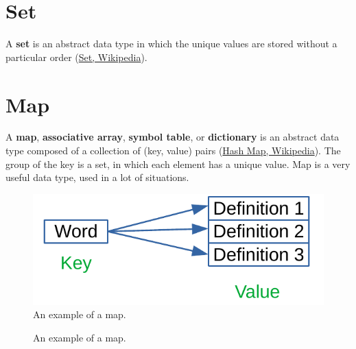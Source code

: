 \section{Set}
A \textbf{set} is an abstract data type in which the unique values are stored without a particular order \cite{wikiset} (\href{https://en.wikipedia.org/wiki/Set_(abstract_data_type)}{Set, Wikipedia}).

\section{Map}
A \textbf{map}, \textbf{associative array}, \textbf{symbol table}, or \textbf{dictionary} is an abstract data type composed of a collection of (key, value) pairs \cite{wikihashmap} (\href{https://en.wikipedia.org/wiki/Associative_array}{Hash Map, Wikipedia}). The group of the key is a set, in which each element has a unique value. Map is a very useful data type, used in a lot of situations. 

\begin{figure}[H]
	\begin{center}
		\includegraphics[scale=.6]{chapters/datastructures/images/map_1.pdf}
		\caption[An example of a map.]{An example of a map.}
		\label{map_1}
	\end{center}
\end{figure}

\begin{figure}[H]
\centering
{}
\caption[An example of a map.]{An example of a map.}
\label{map_1}
\end{figure}

